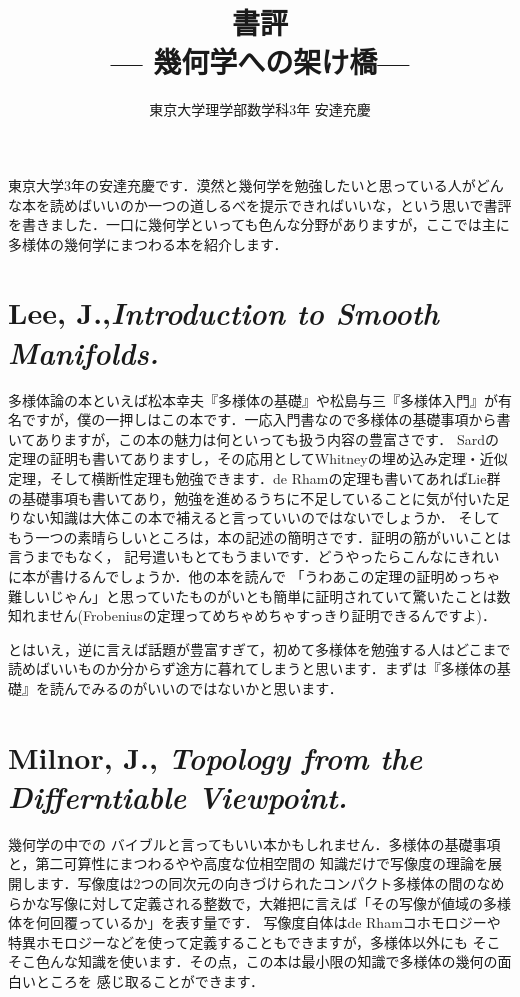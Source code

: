 \documentclass[uplatex]{jsarticle}
\title{書評\\--- 幾何学への架け橋---}
\author{東京大学理学部数学科3年 安達充慶}
\date{}
\begin{document}
\maketitle

東京大学3年の安達充慶です．漠然と幾何学を勉強したいと思っている人がどんな本を読めばいいのか一つの道しるべを提示できればいいな，という思いで書評を書きました．一口に幾何学といっても色んな分野がありますが，ここでは主に多様体の幾何学にまつわる本を紹介します．

\section*{Lee, J.,\textit{Introduction to Smooth Manifolds.}}

多様体論の本といえば松本幸夫『多様体の基礎』や松島与三『多様体入門』が有名ですが，僕の一押しはこの本です．一応入門書なので多様体の基礎事項から書いてありますが，この本の魅力は何といっても扱う内容の豊富さです．
Sardの定理の証明も書いてありますし，その応用としてWhitneyの埋め込み定理・近似定理，そして横断性定理も勉強できます．de Rhamの定理も書いてあればLie群の基礎事項も書いてあり，勉強を進めるうちに不足していることに気が付いた足りない知識は大体この本で補えると言っていいのではないでしょうか．
そしてもう一つの素晴らしいところは，本の記述の簡明さです．証明の筋がいいことは言うまでもなく，
記号遣いもとてもうまいです．どうやったらこんなにきれいに本が書けるんでしょうか．他の本を読んで
「うわあこの定理の証明めっちゃ難しいじゃん」と思っていたものがいとも簡単に証明されていて驚いたことは数知れません(Frobeniusの定理ってめちゃめちゃすっきり証明できるんですよ)．

とはいえ，逆に言えば話題が豊富すぎて，初めて多様体を勉強する人はどこまで読めばいいものか分からず途方に暮れてしまうと思います．まずは『多様体の基礎』を読んでみるのがいいのではないかと思います．


\section*{Milnor, J., \textit{Topology from the Differntiable Viewpoint.}}

幾何学の中での
バイブルと言ってもいい本かもしれません．多様体の基礎事項と，第二可算性にまつわるやや高度な位相空間の
知識だけで写像度の理論を展開します．写像度は2つの同次元の向きづけられたコンパクト多様体の間のなめらかな写像に対して定義される整数で，大雑把に言えば「その写像が値域の多様体を何回覆っているか」を表す量です．
写像度自体はde Rhamコホモロジーや特異ホモロジーなどを使って定義することもできますが，多様体以外にも
そこそこ色んな知識を使います．その点，この本は最小限の知識で多様体の幾何の面白いところを
感じ取ることができます．
\end{document}
